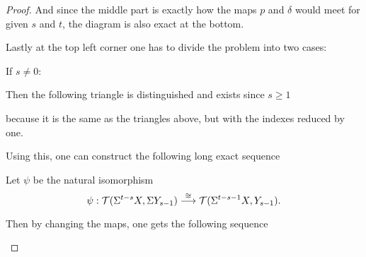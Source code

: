 \begin{proof}
    And since the middle part is exactly how the maps \( p \) and \( \delta \) would meet for given \( s \) and \( t \), the diagram is also exact at the bottom.

    Lastly at the top left corner one has to divide the problem into two cases:

    If \( s \neq 0 \):

    Then the following triangle is distinguished and exists since \( s \geq 1 \)
    \begin{center}
    \end{center}
    because it is the same as the triangles above, but with the indexes reduced by one.

    Using this, one can construct the following long exact sequence
    \begin{center}
    \end{center}

    Let \( \psi \) be the natural isomorphism
    \[
        \psi: {\mathcal{T}}(\Sigma^{t-s} X, \Sigma Y_{s - 1}) \stackrel{\cong}{\longrightarrow} {\mathcal{T}}(\Sigma^{t - s - 1} X, Y_{s - 1}).
    \]

    Then by changing the maps, one gets the following sequence
    \begin{center}
\end{center}
\end{proof}
